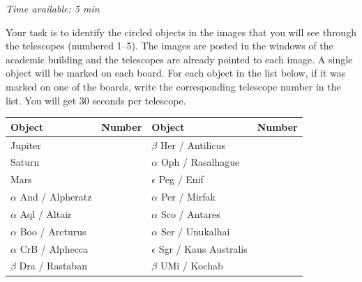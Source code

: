 \emph{Time available: 5 min}

Your task is to identify the circled objects in the images that you will see
through the telescopes (numbered 1--5). The images are posted in the windows
of the academic building and the telescopes are already pointed to each
image. A single object will be marked on each board. For each object in the
list below, if it was marked on one of the boards, write the corresponding
telescope number in the list. You will get 30 seconds per telescope.

\begin{center}
\begin{tabular}{lc|lc}
Object & Number & Object & Number \\
\hline
Jupiter & & $\beta$ Her / Antilicus & \\
Saturn & & $\alpha$ Oph / Rasalhague & \\
Mars & & $\epsilon$ Peg / Enif & \\
$\alpha$ And / Alpheratz & & $\alpha$ Per / Mirfak & \\
$\alpha$ Aql / Altair & & $\alpha$ Sco / Antares & \\
$\alpha$ Boo / Arcturus & & $\alpha$ Ser / Unukalhai & \\
$\alpha$ CrB / Alphecca & & $\epsilon$ Sgr / Kaus Australis & \\
$\beta$ Dra / Rastaban & & $\beta$ UMi / Kochab & \\
\end{tabular}
\end{center}
